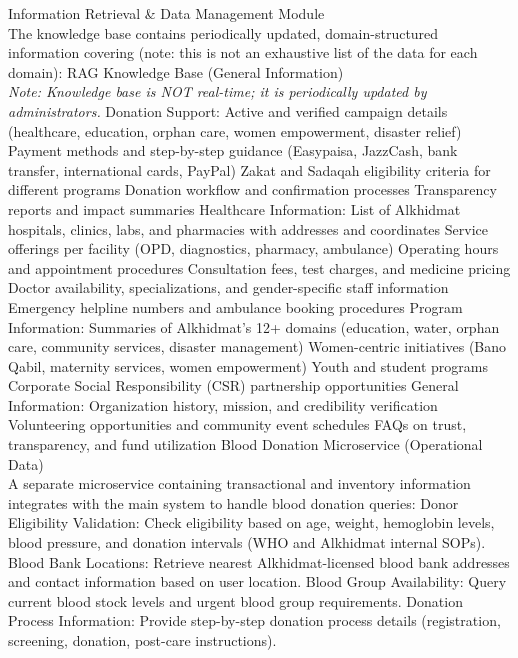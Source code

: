 \begin{outline}
  \1 Information Retrieval \& Data Management Module \\
  The knowledge base contains periodically updated, domain-structured information covering (note: this is not an exhaustive list of the data for each domain): 
  \2 RAG Knowledge Base (General Information) 
  \\\textit{Note: Knowledge base is NOT real-time; it is periodically updated by administrators. }
  \3 Donation Support: 
  \4 Active and verified campaign details (healthcare, education, orphan care, women empowerment, disaster relief) 
  \4 Payment methods and step-by-step guidance (Easypaisa, JazzCash, bank transfer, international cards, PayPal)
  \4 Zakat and Sadaqah eligibility criteria for different programs 
  \4 Donation workflow and confirmation processes
  \4 Transparency reports and impact summaries 
  \3 Healthcare Information: 
  \4 List of Alkhidmat hospitals, clinics, labs, and pharmacies with addresses and coordinates 
  \4 Service offerings per facility (OPD, diagnostics, pharmacy, ambulance) 
  \4 Operating hours and appointment procedures
  \4 Consultation fees, test charges, and medicine pricing
  \4 Doctor availability, specializations, and gender-specific staff information 
  \4 Emergency helpline numbers and ambulance booking procedures 
  \3 Program Information: 
  \4 Summaries of Alkhidmat's 12+ domains (education, water, orphan care, community services, disaster management)
  \4 Women-centric initiatives (Bano Qabil, maternity services, women empowerment) 
  \4 Youth and student programs 
  \4 Corporate Social Responsibility (CSR) partnership opportunities 
  \3 General Information: 
  \4 Organization history, mission, and credibility verification 
  \4 Volunteering opportunities and community event schedules
  \4 FAQs on trust, transparency, and fund utilization 
  \2 Blood Donation Microservice (Operational Data) \\
  A separate microservice containing transactional and inventory information integrates with the main system to handle blood donation queries: 
  \3 Donor Eligibility Validation: Check eligibility based on age, weight, hemoglobin levels, blood pressure, and donation intervals (WHO and Alkhidmat internal SOPs).
  \3 Blood Bank Locations: Retrieve nearest Alkhidmat-licensed blood bank addresses and contact information based on user location. 
  \3 Blood Group Availability: Query current blood stock levels and urgent blood group requirements. 
  \3 Donation Process Information: Provide step-by-step donation process details (registration, screening, donation, post-care instructions). 

\end{outline}
